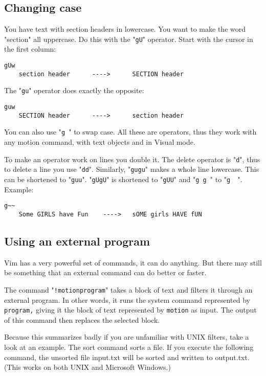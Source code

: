{{\subsection{Changing case}
You have text with section headers in lowercase.
You want to make the word "section" all uppercase.
Do this with the "\texttt{gU}" operator.
Start with the cursor in the first column:

\begin{Verbatim}[samepage=true]
                         gUw
    section header      ---->      SECTION header
\end{Verbatim}

The "\texttt{gu}" operator does exactly the opposite:

\begin{Verbatim}[samepage=true]
                         guw
    SECTION header      ---->      section header
\end{Verbatim}

You can also use "\texttt{g~}" to swap case.
All these are operators, thus they work with any motion command, with text objects and in Visual mode.

To make an operator work on lines you double it.
The delete operator is "\texttt{d}", thus to delete a line you use "\texttt{dd}".
Similarly, "\texttt{gugu}" makes a whole line lowercase.
This can be shortened to "\texttt{guu}".
"\texttt{gUgU}" is shortened to "\texttt{gUU}" and "\texttt{g~g~}" to "\texttt{g~~}".
Example:

\begin{Verbatim}[samepage=true]
                            g~~ 
    Some GIRLS have Fun    ---->   sOME girls HAVE fUN 
\end{Verbatim}
\subsection{Using an external program}
Vim has a very powerful set of commands, it can do anything.
But there may still be something that an external command can do better or faster.

The command "\texttt{!{motion}{program}}" takes a block of text and filters it through an external program.
In other words, it runs the system command represented by \texttt{{program},} giving it the block of text represented by \texttt{{motion}} as input.
The output of this command then replaces the selected block.

Because this summarizes badly if you are unfamiliar with UNIX filters, take a look at an example.
The sort command sorts a file.
If you execute the following command, the unsorted file input.txt will be sorted and written to output.txt.
(This works on both UNIX and Microsoft Windows.)

}}
